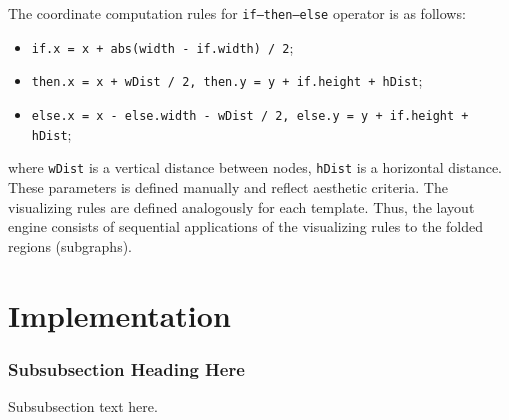 \documentclass[conference]{IEEEtran}
\begin{document}
The coordinate computation rules for \texttt{if--then--else} operator is as follows:
\begin{itemize}
\item \texttt{if.x = x + abs(width - if.width) / 2};
\item \texttt{then.x = x  + wDist / 2, then.y = y + if.height + hDist};
\item \texttt{else.x = x - else.width - wDist / 2, else.y = y + if.height + hDist};
\end{itemize}
where \texttt{wDist} is a vertical distance between nodes, \texttt{hDist} is a horizontal distance.  These parameters is defined manually and reflect aesthetic criteria.  The visualizing rules are defined analogously for each template.  Thus, the layout engine consists of sequential applications of the visualizing rules to the folded regions (subgraphs).

\section{Implementation}
\label{sec:implementation}



\subsubsection{Subsubsection Heading Here}
Subsubsection text here.




%
%
\end{document}

